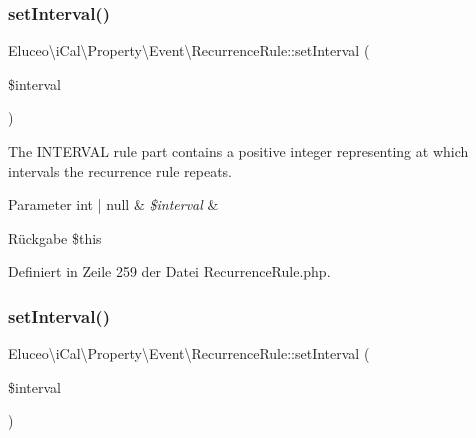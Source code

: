 \subsubsection{\texorpdfstring{set\+Interval()}{setInterval()}\hspace{0.1cm}{\footnotesize\ttfamily [1/3]}}
{\footnotesize\ttfamily Eluceo\textbackslash{}i\+Cal\textbackslash{}\+Property\textbackslash{}\+Event\textbackslash{}\+Recurrence\+Rule\+::set\+Interval (\begin{DoxyParamCaption}\item[{}]{\$interval }\end{DoxyParamCaption})}

The I\+N\+T\+E\+R\+V\+AL rule part contains a positive integer representing at which intervals the recurrence rule repeats.


\begin{DoxyParams}[1]{Parameter}
int | null & {\em \$interval} & \\
\hline
\end{DoxyParams}
\begin{DoxyReturn}{Rückgabe}
\$this 
\end{DoxyReturn}


Definiert in Zeile 259 der Datei Recurrence\+Rule.\+php.

\mbox{\label{class_eluceo_1_1i_cal_1_1_property_1_1_event_1_1_recurrence_rule_ac6b278d4cf770de7f9086d4567a5e098}} 
\subsubsection{\texorpdfstring{set\+Interval()}{setInterval()}\hspace{0.1cm}{\footnotesize\ttfamily [2/3]}}
{\footnotesize\ttfamily Eluceo\textbackslash{}i\+Cal\textbackslash{}\+Property\textbackslash{}\+Event\textbackslash{}\+Recurrence\+Rule\+::set\+Interval (\begin{DoxyParamCaption}\item[{}]{\$interval }\end{DoxyParamCaption})}

